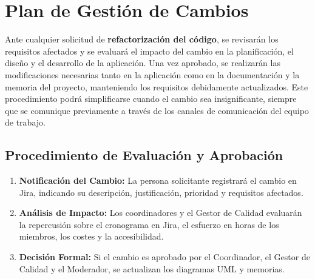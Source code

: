 \section{Plan de Gestión de Cambios}

Ante cualquier solicitud de \textbf{refactorización del código}, se revisarán los requisitos afectados y se evaluará el impacto del cambio en la planificación, el diseño y el desarrollo de la aplicación. Una vez aprobado, se realizarán las modificaciones necesarias tanto en la aplicación como en la documentación y la memoria del proyecto, manteniendo los requisitos debidamente actualizados. Este procedimiento podrá simplificarse cuando el cambio sea insignificante, siempre que se comunique previamente a través de los canales de comunicación del equipo de trabajo.

\subsection{Procedimiento de Evaluación y Aprobación}
\begin{enumerate}[leftmargin=*]
  \item \textbf{Notificación del Cambio:} La persona solicitante registrará el cambio en Jira, indicando su descripción, justificación, prioridad y requisitos afectados.
  \item \textbf{Análisis de Impacto:} Los coordinadores y el Gestor de Calidad evaluarán la repercusión sobre el cronograma en Jira, el esfuerzo en horas de los miembros, los costes y la accesibilidad.
  \item \textbf{Decisión Formal:} Si el cambio es aprobado por el Coordinador, el Gestor de Calidad y el Moderador, se actualizan los diagramas UML y memorias.
\end{enumerate}
